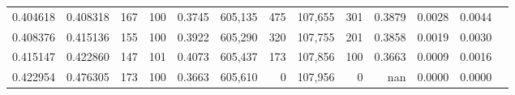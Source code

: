 \begin{tabular}{rrrrrrrrrrrrr}
0.404618 & 0.408318 &   167 & 100 &                                     0.3745 & 605,135 &     475 & 107,655 &     301 & 0.3879 & 0.0028 & 0.0044 \\
0.408376 & 0.415136 &   155 & 100 &                                     0.3922 & 605,290 &     320 & 107,755 &     201 & 0.3858 & 0.0019 & 0.0030 \\
0.415147 & 0.422860 &   147 & 101 &                                     0.4073 & 605,437 &     173 & 107,856 &     100 & 0.3663 & 0.0009 & 0.0016 \\
0.422954 & 0.476305 &   173 & 100 &                                     0.3663 & 605,610 &       0 & 107,956 &       0 &    nan & 0.0000 & 0.0000 \\
\bottomrule
\end{tabular}
